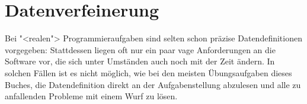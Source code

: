 
\section{Datenverfeinerung}

Bei "<realen"> Programmieraufgaben sind selten schon präzise
Datendefinitionen vorgegeben: Stattdessen liegen oft nur ein paar vage
Anforderungen an die Software vor, die sich unter Umständen auch noch
mit der Zeit ändern.  In solchen Fällen ist es nicht möglich, wie bei
den meisten Übungsaufgaben dieses Buches, die Datendefinition direkt
an der Aufgabenstellung abzulesen und alle zu anfallenden Probleme mit
einem Wurf zu lösen.

